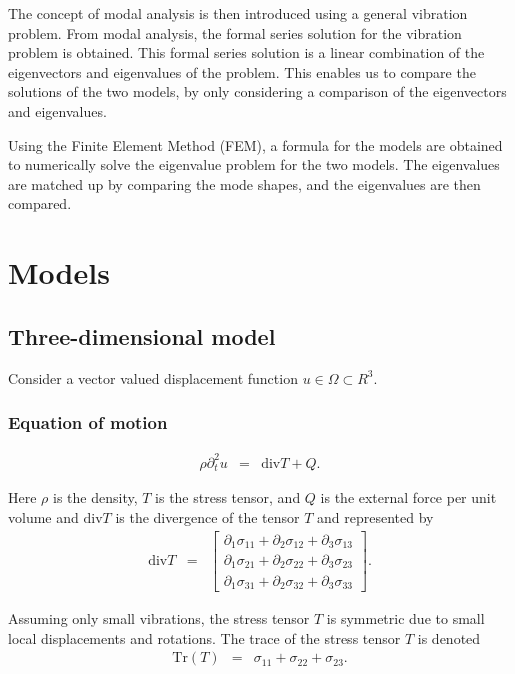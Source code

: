 The concept of modal analysis is then introduced using a general vibration problem. From modal analysis, the formal series solution for the vibration problem is obtained. This formal series solution is a linear combination of the eigenvectors and eigenvalues of the problem. This enables us to compare the solutions of the two models, by only considering a comparison of the eigenvectors and eigenvalues.

Using the Finite Element Method (FEM), a formula for the models are obtained to numerically solve the eigenvalue problem for the two models. The eigenvalues are matched up by comparing the mode shapes, and the eigenvalues are then compared. 


\section{Models}
\subsection{Three-dimensional model}
Consider a vector valued displacement function $u \in \Omega \subset R^3$.

\subsubsection*{Equation of motion}\label{ssec:3D_Model:EquationOfMotion}
\begin{eqnarray}
	\rho\partial_t^2 u & = & \textrm{div}T + Q. \label{eq:3D_Model:EM}
\end{eqnarray} \label{sym:rho} \label{sym:partial_diff} \label{sym:T} \label{sym:Q}

Here $\rho$ is the density, $T$ is the stress tensor, and $Q$ is the external 
force per unit volume and $\textrm{div}T$ is the divergence of the tensor $T$ and represented by
\begin{eqnarray}
	\textrm{div}  T & = &
	\begin{bmatrix}
		\partial_1 \sigma_{11} + \partial_2 \sigma_{12} + \partial_3 \sigma_{13} \\
		\partial_1 \sigma_{21} + \partial_2 \sigma_{22} + \partial_3 \sigma_{23} \\
		\partial_1 \sigma_{31} + \partial_2 \sigma_{32} + \partial_3 \sigma_{33}
	\end{bmatrix}. \label{eq:3D_Model:divT}
\end{eqnarray}

Assuming only small vibrations, the stress tensor $T$ is symmetric due to small
local displacements and rotations. The trace of the stress tensor $T$ is denoted
\begin{eqnarray}
	\textrm{Tr}(T) & = & \sigma_{11} + \sigma_{22} + \sigma_{23}. \label{eq:stress_tensor_t}
\end{eqnarray}

